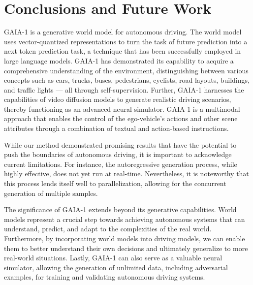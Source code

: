 \section{Conclusions and Future Work}
\label{section:conclusion}
GAIA-1 is a generative world model for autonomous driving. The world model uses vector-quantized representations to turn the task of future prediction into a next token prediction task, a technique that has been successfully employed in large language models. GAIA-1 has demonstrated its capability to acquire a comprehensive understanding of the environment, distinguishing between various concepts such as cars, trucks, buses, pedestrians, cyclists, road layouts, buildings, and traffic lights --- all through self-supervision. Further, GAIA-1 harnesses the capabilities of video diffusion models to generate realistic driving scenarios, thereby functioning as an advanced neural simulator. GAIA-1 is a multimodal approach that enables the control of the ego-vehicle's actions and other scene attributes through a combination of textual and action-based instructions.

While our method demonstrated promising results that have the potential to push the boundaries of autonomous driving, it is important to acknowledge current limitations. For instance, the autoregressive generation process, while highly effective, does not yet run at real-time. Nevertheless, it is noteworthy that this process lends itself well to parallelization, allowing for the concurrent generation of multiple samples.

The significance of GAIA-1 extends beyond its generative capabilities. World models represent a crucial step towards achieving autonomous systems that can understand, predict, and adapt to the complexities of the real world. Furthermore, by incorporating world models into driving models, we can enable them to better understand their own decisions and ultimately generalize to more real-world situations. Lastly, GAIA-1 can also serve as a valuable neural simulator, allowing the generation of unlimited data, including adversarial examples, for training and validating autonomous driving systems. 
